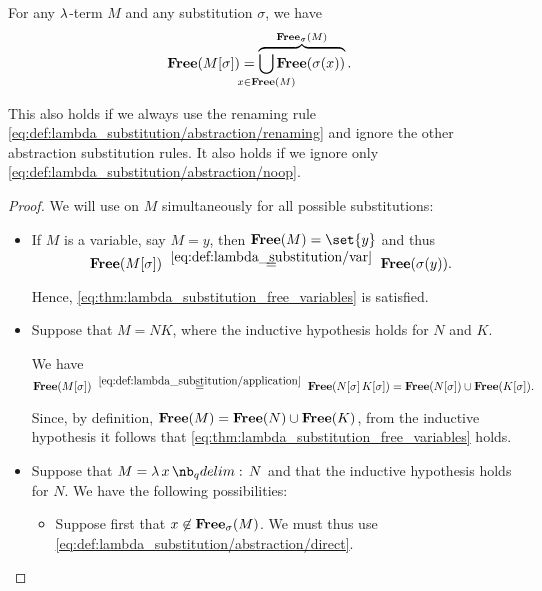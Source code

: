 \begin{proposition}\label{thm:lambda_substitution_free_variables}
  For any \( \mathrm{\lambda} \)-term \( M \) and any substitution \( \sigma \), we have
  \begin{equation}\label{eq:thm:lambda_substitution_free_variables}
    \op*{Free}( M[\sigma] ) = \overbrace{\bigcup_{\mathclap{x \in \op*{Free}(M)}} \op*{Free}(\sigma(x))}^{\op*{Free}_\sigma(M)}.
  \end{equation}

  This also holds if we always use the renaming rule \eqref{eq:def:lambda_substitution/abstraction/renaming} and ignore the other abstraction substitution rules. It also holds if we ignore only \eqref{eq:def:lambda_substitution/abstraction/noop}.
\end{proposition}
\begin{proof}
  We will use  on \( M \) simultaneously for all possible substitutions:
  \begin{itemize}
    \item If \( M \) is a variable, say \( M = y \), then \( \op*{Free}(M) = \set{ y } \) and thus
    \begin{equation*}
      \op*{Free}(M[\sigma])
      \reloset {\eqref{eq:def:lambda_substitution/var}} =
      \op*{Free}(\sigma(y)).
    \end{equation*}

    Hence, \eqref{eq:thm:lambda_substitution_free_variables} is satisfied.

    \item Suppose that \( M = NK \), where the inductive hypothesis holds for \( N \) and \( K \).

    We have
    \begin{equation*}
      \op*{Free}(M[\sigma])
      \reloset {\eqref{eq:def:lambda_substitution/application}} =
      \op*{Free}(N[\sigma] \thinspace K[\sigma])
      =
      \op*{Free}(N[\sigma]) \cup \op*{Free}(K[\sigma]).
    \end{equation*}

    Since, by definition, \( \op*{Free}(M) = \op*{Free}(N) \cup \op*{Free}(K) \), from the inductive hypothesis it follows that \eqref{eq:thm:lambda_substitution_free_variables} holds.

    \item Suppose that \( M = \qabs x N \) and that the inductive hypothesis holds for \( N \). We have the following possibilities:
    \begin{itemize}
      \item Suppose first that \( x \not\in \op*{Free}_\sigma(M) \). We must thus use \eqref{eq:def:lambda_substitution/abstraction/direct}.


\end{itemize}
\end{itemize}
\end{proof}
